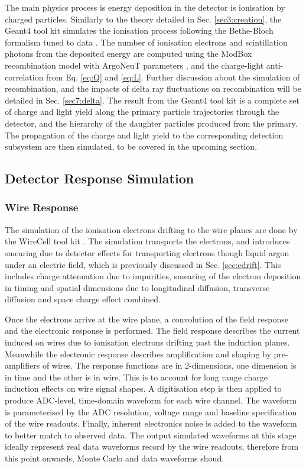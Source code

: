 The main physics process is energy deposition in the detector is ionisation by charged particles.
Similarly to the theory detailed in Sec. \ref{sec3:creation}, the Geant4 tool kit simulates the ionisation process following the Bethe-Bloch formalism tuned to data \cite{geant4_ions}.
The number of ionisation electrons and scintillation photons from the deposited energy are computed using the ModBox recombination model with ArgoNeuT parameters \cite{argoneut_recomb}, and the charge-light anti-correlation from Eq. \ref{eq:Q} and \ref{eq:L}. 
Further discussion about the simulation of recombination, and the impacts of delta ray fluctuations on recombination will be detailed in Sec. \ref{sec7:delta}.
The result from the Geant4 tool kit is a complete set of charge and light yield along the primary particle trajectories through the detector, and the hierarchy of the daughter particles produced from the primary.
The propagation of the charge and light yield to the corresponding detection subsystem are then simulated, to be covered in the upcoming section.

\subsection{Detector Response Simulation}
\label{sec:gen_response}

\subsubsection{Wire Response}

The simulation of the ionisation electrons drifting to the wire planes are done by the WireCell tool kit \cite{wirecell}.
The simulation transports the electrons, and introduces smearing due to detector effects for transporting electrons though liquid argon under an electric field, which is previously discussed in Sec. \ref{sec:edrift}.
This includes charge attenuation due to impurities, smearing of the electron deposition in timing and spatial dimensions due to longitudinal diffusion, transverse diffusion and space charge effect combined.

Once the electrons arrive at the wire plane, a convolution of the field response and the electronic response is performed.
The field response describes the current induced on wires due to ionisation electrons drifting past the induction planes.
Meanwhile the electronic response describes amplification and shaping by pre-amplifiers of wires.
The response functions are in 2-dimensions, one dimension is in time and the other is in wire.
This is to account for long range charge induction effects on wire signal shapes.
A digitisation step is then applied to produce ADC-level, time-domain waveform for each wire channel.
The waveform is parameterised by the ADC resolution, voltage range and baseline specification of the wire readouts. 
Finally, inherent electronics noise is added to the waveform to better match to observed data.
The output simulated waveforms at this stage ideally represent real data waveforms record by the wire readouts, therefore from this point onwards, Monte Carlo and data waveforms shoud.

